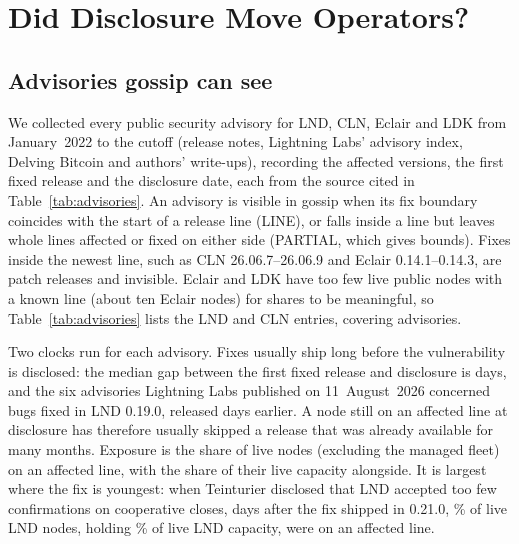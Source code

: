 \section{Did Disclosure Move Operators?}
\label{sec:exposure}

\subsection{Advisories gossip can see}
We collected every public security advisory for LND, CLN, Eclair and LDK from January~2022 to the cutoff (release
notes, Lightning Labs' advisory index, Delving Bitcoin and authors' write-ups), recording the affected versions, the
first fixed release and the disclosure date, each from the source cited in Table~\ref{tab:advisories}. An advisory is
visible in gossip when its fix boundary coincides with the start of a release line (LINE), or falls inside a line but
leaves whole lines affected or fixed on either side (PARTIAL, which gives bounds). Fixes inside the newest line, such
as CLN 26.06.7--26.06.9 and Eclair 0.14.1--0.14.3, are patch releases and invisible. Eclair and LDK have too few live
public nodes with a known line (about ten Eclair nodes) for shares to be meaningful, so Table~\ref{tab:advisories}
lists the \NAdvRows{} LND and CLN entries, covering \NAdvTotal{} advisories.

Two clocks run for each advisory. Fixes usually ship long before the vulnerability is disclosed: the median gap
between the first fixed release and disclosure is \FixToDiscMedian{} days, and the six advisories Lightning Labs
published on 11~August~2026 concerned bugs fixed in LND 0.19.0, released \FixToDiscLLBatch{} days earlier. A node
still on an affected line at disclosure has therefore usually skipped a release that was already available for many
months. Exposure is the share of live nodes (excluding the managed fleet) on an affected line, with the share of
their live capacity alongside. It is largest where the fix is youngest: when Teinturier disclosed that LND accepted
too few confirmations on cooperative closes, \FixToDiscLndCloseconf{} days after the fix shipped in 0.21.0,
\ExpLndCloseconfDisc\% of live LND nodes, holding \ExpCapLndCloseconfDisc\% of live LND capacity, were on an
affected line.




